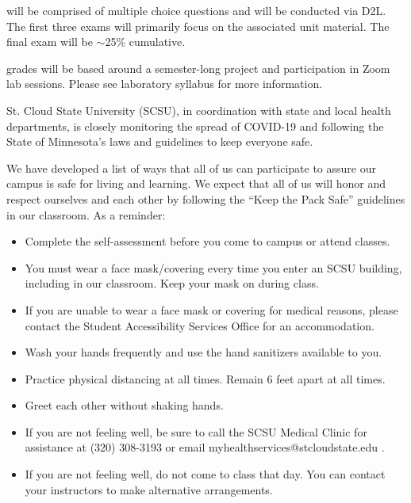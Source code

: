 \documentclass{tufte-handout}
\begin{document}
\newpage 
\begin{fullwidth}

 will be comprised of multiple choice questions and will be conducted via D2L. The first three exams will primarily focus on the associated unit material. The final exam will be $\sim$25\% cumulative. 




 grades will be based around a semester-long project and participation in Zoom lab sessions. Please see laboratory syllabus for more information. 



St. Cloud State University (SCSU), in coordination with state and local health departments, is closely monitoring the spread of COVID-19 and following the State of Minnesota’s laws and guidelines to keep everyone safe.

We have developed a list of ways that all of us can participate to assure our campus is safe for living and learning. We expect that all of us will honor and respect ourselves and each other by following the ``Keep the Pack Safe'' guidelines in our classroom. As a reminder:

\begin{itemize}
\item Complete the self-assessment before you come to campus or attend classes.
\item You must wear a face mask/covering every time you enter an SCSU building, including in our classroom. Keep your mask on during class.
\item If you are unable to wear a face mask or covering for medical reasons, please contact the Student Accessibility Services Office for an accommodation.
\item Wash your hands frequently and use the hand sanitizers available to you.
\item Practice physical distancing at all times. Remain 6 feet apart at all times.
\item Greet each other without shaking hands.
\item If you are not feeling well, be sure to call the SCSU Medical Clinic for assistance at (320) 308-3193 or email myhealthservices@stcloudstate.edu .
\item If you are not feeling well, do not come to class that day. You can contact your instructors to make alternative arrangements.
\end{itemize}


\end{fullwidth}
\end{document}
